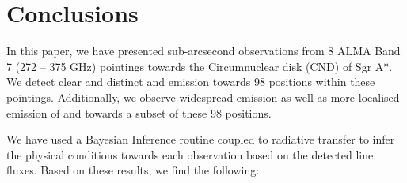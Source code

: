 \documentclass[twocolumn]{aastex631}
\begin{document}


\section{Conclusions} \label{sec:conclude}

In this paper, we have presented sub-arcsecond observations from 8 ALMA Band 7 (272 -- 375 \si{\giga\hertz}) pointings towards the Circumnuclear disk (CND) of Sgr A*. We detect clear and distinct  and  emission towards 98 positions within these pointings. Additionally, we observe widespread  emission as well as more localised emission of  and  towards a subset of these 98 positions. 

We have used a Bayesian Inference routine coupled to radiative transfer to infer the physical conditions towards each observation based on the detected line fluxes. Based on these results, we find the following:
\end{document}

